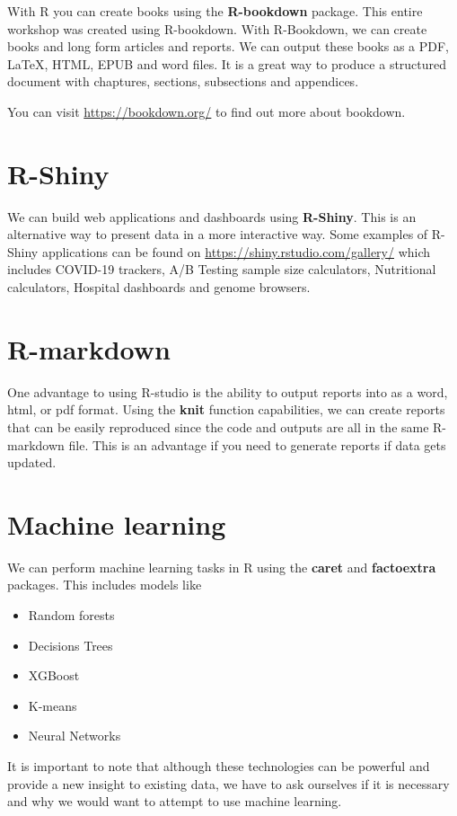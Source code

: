 \documentclass[
]{book}
\begin{document}
With R you can create books using the \textbf{R-bookdown} package. This entire workshop was created using R-bookdown. With R-Bookdown, we can create books and long form articles and reports. We can output these books as a PDF, LaTeX, HTML, EPUB and word files. It is a great way to produce a structured document with chaptures, sections, subsections and appendices.

You can visit \url{https://bookdown.org/} to find out more about bookdown.

\hypertarget{r-shiny}{%
\section{R-Shiny}\label{r-shiny}}

We can build web applications and dashboards using \textbf{R-Shiny}. This is an alternative way to present data in a more interactive way. Some examples of R-Shiny applications can be found on \url{https://shiny.rstudio.com/gallery/} which includes COVID-19 trackers, A/B Testing sample size calculators, Nutritional calculators, Hospital dashboards and genome browsers.

\hypertarget{r-markdown}{%
\section{R-markdown}\label{r-markdown}}

One advantage to using R-studio is the ability to output reports into as a word, html, or pdf format. Using the \textbf{knit} function capabilities, we can create reports that can be easily reproduced since the code and outputs are all in the same R-markdown file. This is an advantage if you need to generate reports if data gets updated.

\hypertarget{machine-learning}{%
\section{Machine learning}\label{machine-learning}}

We can perform machine learning tasks in R using the \textbf{caret} and \textbf{factoextra} packages. This includes models like

\begin{itemize}
\item
  Random forests
\item
  Decisions Trees
\item
  XGBoost
\item
  K-means
\item
  Neural Networks
\end{itemize}

It is important to note that although these technologies can be powerful and provide a new insight to existing data, we have to ask ourselves if it is necessary and why we would want to attempt to use machine learning.

  
\end{document}
